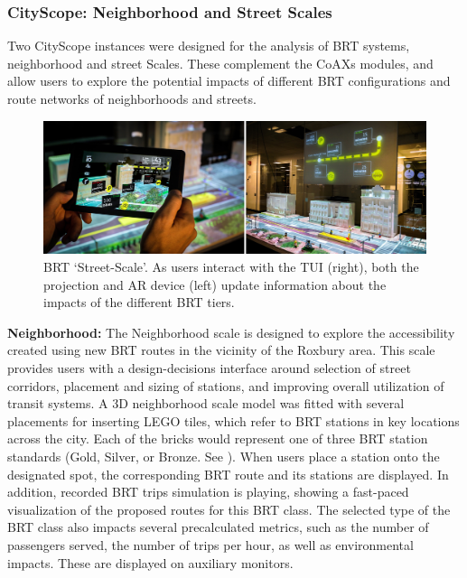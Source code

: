 {{        \subsubsection{CityScope: Neighborhood and Street Scales}
        {
            Two CityScope instances were designed for the analysis of BRT systems, neighborhood and street Scales. These complement the CoAXs modules, and allow users to explore the potential impacts of different BRT configurations and route networks of neighborhoods and streets.


            \begin{figure}[!htb]
                \begin{center}
                    \includegraphics[width=1\textwidth]{chapters/consensus/BRT/figures/brt6.jpeg}
                \end{center}
                \caption{BRT `Street-Scale'. As users interact with the TUI (right), both the projection and AR device (left) update information about the impacts of the different BRT tiers.}
                \label{fig:brt_street}
            \end{figure}

            \textbf{Neighborhood:} The Neighborhood scale is designed to explore the accessibility created using new BRT routes in the vicinity of the Roxbury area. This scale provides users with a design-decisions interface around selection of street corridors, placement and sizing of stations, and improving overall utilization of transit systems. A 3D neighborhood scale model was fitted with several placements for inserting LEGO tiles, which refer to BRT stations in key locations across the city. Each of the bricks would represent one of three BRT station standards (Gold, Silver, or Bronze. See \cite{Aboutthe77:online}). When users place a station onto the designated spot, the corresponding BRT route and its stations are displayed. In addition, recorded BRT trips simulation is playing, showing a fast-paced visualization of the proposed routes for this BRT class. The selected type of the BRT class also impacts several precalculated metrics, such as the number of passengers served, the number of trips per hour, as well as environmental impacts. These are displayed on auxiliary monitors.

}}}

